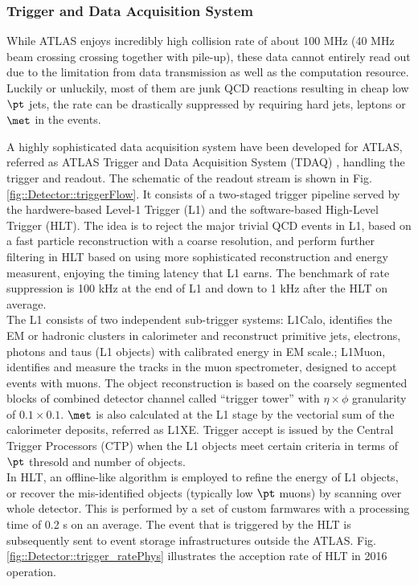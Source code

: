 \subsubsection{Trigger and Data Acquisition System}
While ATLAS enjoys incredibly high collision rate of about 100 MHz (40 MHz beam crossing crossing together with pile-up),
these data cannot entirely read out due to the limitation from data transmission as well as the computation resource.
Luckily or unluckily, most of them are junk QCD reactions resulting in cheap low $\pt$ jets, 
the rate can be drastically suppressed by requiring hard jets, leptons or $\met$ in the events.

A highly sophisticated data acquisition system have been developed for ATLAS, referred as ATLAS Trigger and Data Acquisition System (TDAQ) \cite{trigger2015}, handling the trigger and readout. The schematic of the readout stream is shown in Fig. \ref{fig::Detector::triggerFlow}.
It consists of a two-staged trigger pipeline served by the hardwere-based Level-1 Trigger (L1) and the software-based High-Level Trigger (HLT).
The idea is to reject the major trivial QCD events in L1, based on a fast particle reconstruction with a coarse resolution, and perform further filtering in HLT based on using more sophisticated reconstruction and energy measurent, enjoying the timing latency that L1 earns. The benchmark of rate suppression is 100 kHz at the end of L1 and down to 1 kHz after the HLT on average. \\
The L1 consists of two independent sub-trigger systems: L1Calo, identifies the EM or hadronic clusters in calorimeter and reconstruct primitive jets, electrons, photons and taus (L1 objects) with calibrated energy in EM scale.; L1Muon, identifies and measure the tracks in the muon spectrometer, designed to accept events with muons. 
The object reconstruction is based on the coarsely segmented blocks of combined detector channel called ``trigger tower'' with $\eta\times\phi$ granularity of $0.1 \times 0.1$. 
$\met$ is also calculated at the L1 stage by the vectorial sum of the calorimeter deposits, referred as L1XE. Trigger accept is issued by the Central Trigger Processors (CTP) when the L1 objects meet certain criteria in terms of $\pt$ thresold and number of objects.  \\

In HLT, an offline-like algorithm is employed to refine the energy of L1 objects, or recover the mis-identified objects (typically low $\pt$ muons) by scanning over whole detector. This is performed by a set of custom farmwares with a processing time of 0.2 s on an average. The event that is triggered by the HLT is subsequently sent to event storage infrastructures outside the ATLAS. 
Fig. \ref{fig::Detector::trigger_ratePhys} illustrates the acception rate of HLT in 2016 operation. \\

